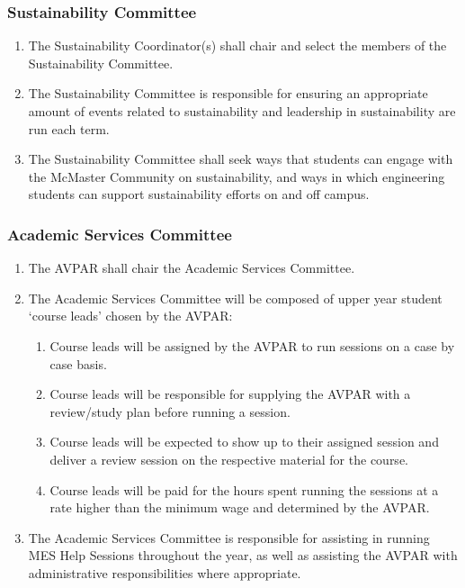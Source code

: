 \hypertarget{sustainability-committee}{%
 \subsubsection{Sustainability
  Committee}
 \label{sustainability-committee}}
\begin{enumerate}
 \item
  The Sustainability Coordinator(s) shall chair and select the members
  of the Sustainability Committee.
 \item
  The Sustainability Committee is responsible for ensuring an
  appropriate amount of events related to sustainability and leadership
  in sustainability are run each term.
 \item
  The Sustainability Committee shall seek ways that students can engage
  with the McMaster Community on sustainability, and ways in which
  engineering students can support sustainability efforts on and off
  campus.
\end{enumerate}

\hypertarget{academic-services-committee}{%
 \subsubsection{Academic Services
  Committee}
 \label{academic-services-committee}}
\begin{enumerate}
 \item
  The AVPAR shall chair the Academic Services Committee.
 \item
  The Academic Services Committee will be composed of upper year student
  `course leads' chosen by the AVPAR:

  \begin{enumerate}
   \item
    Course leads will be assigned by the AVPAR to run sessions on a case
    by case basis.
   \item
    Course leads will be responsible for supplying the AVPAR with a
    review/study plan before running a session.
   \item
    Course leads will be expected to show up to their assigned session
    and deliver a review session on the respective material for the
    course.
   \item
    Course leads will be paid for the hours spent running the sessions
    at a rate higher than the minimum wage and determined by the AVPAR.
  \end{enumerate}
 \item
  The Academic Services Committee is responsible for assisting in
  running MES Help Sessions throughout the year, as well as assisting
  the AVPAR with administrative responsibilities where appropriate.

\end{enumerate}

